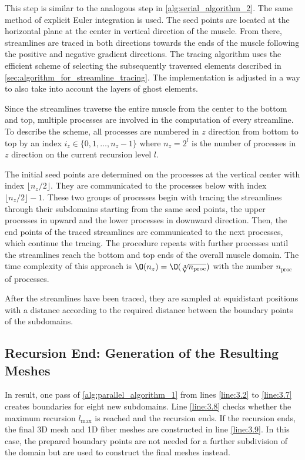 This step is similar to the analogous step in \cref{alg:serial_algorithm_2}. 
The same method of explicit Euler integration is used. The seed points are located at the horizontal plane at the center in vertical direction of the muscle. From there, streamlines are traced in both directions towards the ends of the muscle following the positive and negative gradient directions.
The tracing algorithm uses the efficient scheme of selecting the subsequently traversed elements described in \cref{sec:algorithm_for_streamline_tracing}. The implementation is adjusted in a way to also take into account the layers of ghost elements.

Since the streamlines traverse the entire muscle from the center to the bottom and top, multiple processes are involved in the computation of every streamline. To describe the scheme, all processes are numbered in $z$ direction from bottom to top by an index $i_z \in \{0, 1, \dots, n_z-1\}$ where $n_z = 2^l$ is the number of processes in $z$ direction on the current recursion level $l$.

The initial seed points are determined on the processes at the vertical center with index $\lfloor n_z/2\rfloor$. They are communicated to the processes below with index $\lfloor n_z/2\rfloor-1$. These two groups of processes begin with tracing the streamlines through their subdomains starting from the same seed points, the upper processes in upward and the lower processes in downward direction. Then, the end points of the traced streamlines are communicated to the next processes, which continue the tracing. The procedure repeats with further processes until the streamlines reach the bottom and top ends of the overall muscle domain.
The time complexity of this approach is $\O(n_z) = \O(\sqrt[3]{n_\text{proc}})$ with the number $n_\text{proc}$ of processes.

After the streamlines have been traced, they are sampled at equidistant positions with a distance according to the required distance between the boundary points of the subdomains.

\subsection{Recursion End: Generation of the Resulting Meshes}

In result, one pass of \cref{alg:parallel_algorithm_1} from lines \ref{line:3.2} to \ref{line:3.7} creates boundaries for eight new subdomains. Line \ref{line:3.8} checks whether the maximum recursion $l_\text{max}$ is reached and the recursion ends. If the recursion ends, the final 3D mesh and 1D fiber meshes are constructed in line \ref{line:3.9}. In this case, the prepared boundary points are not needed for a further subdivision of the domain but are used to construct the final meshes instead.

